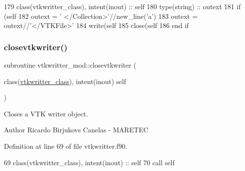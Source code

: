\begin{DoxyCode}
179     \textcolor{keywordtype}{class}(vtkwritter\_class), \textcolor{keywordtype}{intent(inout)} :: self
180     \textcolor{keywordtype}{type}(string) :: outext
181     \textcolor{keywordflow}{if} (self%
182         outext = \textcolor{stringliteral}{'  </Collection>'}//new\_line(\textcolor{stringliteral}{'a'})
183         outext = outext//\textcolor{stringliteral}{'</VTKFile>'}
184         \textcolor{keyword}{write}(self%
185         \textcolor{keyword}{close}(self%
186 \textcolor{keywordflow}{    end if}    
\end{DoxyCode}
\mbox{\label{namespacevtkwritter__mod_a13f1b870d2367704bcd4143a80b552f9}} 
\subsubsection{\texorpdfstring{closevtkwriter()}{closevtkwriter()}}
{\footnotesize\ttfamily subroutine vtkwritter\+\_\+mod\+::closevtkwriter (\begin{DoxyParamCaption}\item[{class(\mbox{\hyperlink{structvtkwritter__mod_1_1vtkwritter__class}{vtkwritter\+\_\+class}}), intent(inout)}]{self }\end{DoxyParamCaption})\hspace{0.3cm}{\ttfamily [private]}}



Closes a V\+TK writer object. 

\begin{DoxyAuthor}{Author}
Ricardo Birjukovs Canelas -\/ M\+A\+R\+E\+T\+EC 
\end{DoxyAuthor}


Definition at line 69 of file vtkwritter.\+f90.


\begin{DoxyCode}
69     \textcolor{keywordtype}{class}(vtkwritter\_class), \textcolor{keywordtype}{intent(inout)} :: self
70     \textcolor{keyword}{call }self%
\end{DoxyCode}
\mbox{\label{namespacevtkwritter__mod_a9f44d9fd1c5da759c4f2d721d12a8181}} 
